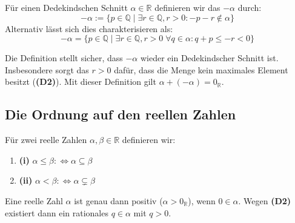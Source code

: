 \begin{math-stroke}
\begin{definition}\label{def:additives-inverses}
Für einen Dedekindschen Schnitt $\alpha \in \mathbb{R}$ definieren wir das  $-\alpha$ durch:
\begin{equation}
\label{eq:additives-inverses-def}
-\alpha := \{ p \in \mathbb{Q} \mid \exists r \in \mathbb{Q}, r > 0 \colon -p - r \notin \alpha \}
\end{equation}
Alternativ lässt sich dies charakterisieren als:
\[ -\alpha = \{ p \in \mathbb{Q} \mid \exists r \in \mathbb{Q}, r > 0 \; \forall q \in \alpha \colon q + p \le -r < 0 \} \]
\end{definition}

\begin{explanation-of-steps}
Die Definition stellt sicher, dass $-\alpha$ wieder ein Dedekindscher Schnitt ist. Insbesondere sorgt das $r > 0$ dafür, dass die Menge kein maximales Element besitzt (\textbf{(D2)}). Mit dieser Definition gilt $\alpha + (-\alpha) = 0_{\mathbb{R}}$.
\end{explanation-of-steps}
\end{math-stroke}

\subsection{Die Ordnung auf den reellen Zahlen}
\begin{math-stroke}
\begin{definition}\label{def:ordnung-reell}
Für zwei reelle Zahlen $\alpha, \beta \in \mathbb{R}$ definieren wir:
\begin{enumerate}[label=\textbf{(\roman*)}]
    \item \textbf{(i)} $\alpha \le \beta :\iff \alpha \subseteq \beta$
    \item \textbf{(ii)} $\alpha < \beta :\iff \alpha \subsetneq \beta$
\end{enumerate}
\end{definition}

\begin{remark}[Positivität]
\label{rem:positivitaet}
Eine reelle Zahl $\alpha$ ist genau dann positiv ($\alpha > 0_{\mathbb{R}}$), wenn $0 \in \alpha$. Wegen \textbf{(D2)} existiert dann ein rationales $q \in \alpha$ mit $q > 0$.
\end{remark}
\end{math-stroke}

